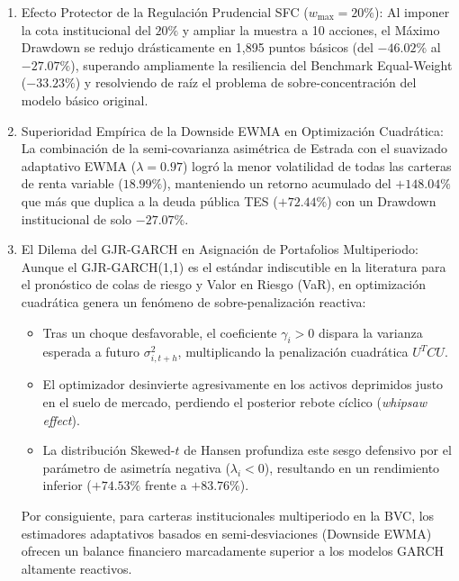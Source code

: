 \documentclass[11pt,a4paper]{article}
\begin{document}
\begin{enumerate}
    \item Efecto Protector de la Regulación Prudencial SFC ($w_{\max} = 20\%$):
    Al imponer la cota institucional del $20\%$ y ampliar la muestra a 10 acciones, el Máximo Drawdown se redujo drásticamente en 1,895 puntos básicos (del $-46.02\%$ al $-27.07\%$), superando ampliamente la resiliencia del Benchmark Equal-Weight ($-33.23\%$) y resolviendo de raíz el problema de sobre-concentración del modelo básico original.
    
    \item Superioridad Empírica de la Downside EWMA en Optimización Cuadrática:
    La combinación de la semi-covarianza asimétrica de Estrada con el suavizado adaptativo EWMA ($\lambda=0.97$) logró la menor volatilidad de todas las carteras de renta variable ($18.99\%$), manteniendo un retorno acumulado del $+148.04\%$ que más que duplica a la deuda pública TES ($+72.44\%$) con un Drawdown institucional de solo $-27.07\%$.
    
    \item El Dilema del GJR-GARCH en Asignación de Portafolios Multiperiodo:
    Aunque el GJR-GARCH(1,1) es el estándar indiscutible en la literatura para el pronóstico de colas de riesgo y Valor en Riesgo (VaR), en optimización cuadrática genera un fenómeno de sobre-penalización reactiva:
    \begin{itemize}
        \item Tras un choque desfavorable, el coeficiente $\gamma_i > 0$ dispara la varianza esperada a futuro $\sigma_{i,t+h}^2$, multiplicando la penalización cuadrática $U^T C U$.
        \item El optimizador desinvierte agresivamente en los activos deprimidos justo en el suelo de mercado, perdiendo el posterior rebote cíclico (\emph{whipsaw effect}).
        \item La distribución Skewed-$t$ de Hansen profundiza este sesgo defensivo por el parámetro de asimetría negativa ($\lambda_i < 0$), resultando en un rendimiento inferior ($+74.53\%$ frente a $+83.76\%$).
    \end{itemize}
    Por consiguiente, para carteras institucionales multiperiodo en la BVC, los estimadores adaptativos basados en semi-desviaciones (Downside EWMA) ofrecen un balance financiero marcadamente superior a los modelos GARCH altamente reactivos.
\end{enumerate}
\end{document}
